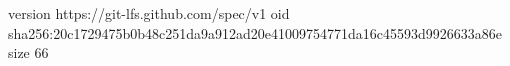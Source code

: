 version https://git-lfs.github.com/spec/v1
oid sha256:20c1729475b0b48c251da9a912ad20e41009754771da16c45593d9926633a86e
size 66
